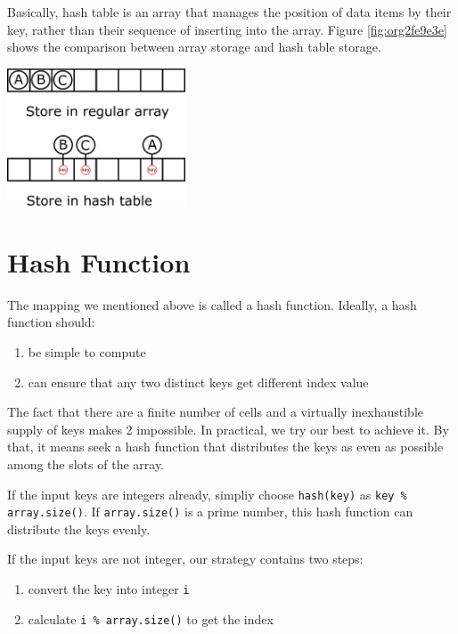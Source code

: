 \documentclass[12pt]{book}
\begin{document}
Basically, hash table is an array that manages the position of data items by their key, rather than their sequence of inserting into the array. Figure \ref{fig:org2fe9e3e} shows the comparison between array storage and hash table storage.

\begin{center}
\includegraphics[width=200px]{./img/Hash-hashtable-illustration.pdf}
\end{center}


\section{Hash Function}
\label{sec:org64d86c5}

The mapping we mentioned above is called a hash function. Ideally, a hash function should:
\begin{enumerate}
\item be simple to compute
\item can ensure that any two distinct keys get different index value
\end{enumerate}

The fact that there are a finite number of cells and a virtually inexhaustible supply of keys makes 2 impossible. In practical, we try our best to achieve it. By that, it means seek a hash function that distributes the keys as even as possible among the slots of the array.

If the input keys are integers already, simpliy choose \texttt{hash(key)} as \texttt{key \% array.size()}. If \texttt{array.size()} is a prime number, this hash function can distribute the keys evenly.

If the input keys are not integer, our strategy contains two steps:
\begin{enumerate}
\item convert the key into integer \texttt{i}
\item calculate \texttt{i \% array.size()} to get the index
\end{enumerate}
\end{document}
